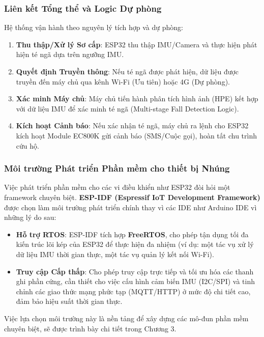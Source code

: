 \subsubsection{Liên kết Tổng thể và Logic Dự phòng}
Hệ thống vận hành theo nguyên lý tích hợp và dự phòng:
\begin{enumerate}
    \item \textbf{Thu thập/Xử lý Sơ cấp}: ESP32 thu thập IMU/Camera và thực hiện phát hiện té ngã dựa trên ngưỡng IMU.
    \item \textbf{Quyết định Truyền thông}: Nếu té ngã được phát hiện, dữ liệu được truyền đến máy chủ qua kênh Wi-Fi (Ưu tiên) hoặc 4G (Dự phòng).
    \item \textbf{Xác minh Máy chủ}: Máy chủ tiến hành phân tích hình ảnh (HPE) kết hợp với dữ liệu IMU để xác minh té ngã (Multi-stage Fall Detection Logic).
    \item \textbf{Kích hoạt Cảnh báo}: Nếu xác nhận té ngã, máy chủ ra lệnh cho ESP32 kích hoạt Module EC800K gửi cảnh báo (SMS/Cuộc gọi), hoàn tất chu trình cứu hộ.
\end{enumerate}

\subsubsection{Môi trường Phát triển Phần mềm cho thiết bị Nhúng}
Việc phát triển phần mềm cho các vi điều khiển như ESP32 đòi hỏi một framework chuyên biệt. \textbf{ESP-IDF (Espressif IoT Development Framework)} được chọn làm môi trường phát triển chính thay vì các IDE như Arduino IDE vì những lý do sau:
\begin{itemize}
    \item \textbf{Hỗ trợ RTOS}: ESP-IDF tích hợp \textbf{FreeRTOS}, cho phép tận dụng tối đa kiến trúc lõi kép của ESP32 để thực hiện đa nhiệm (ví dụ: một tác vụ xử lý dữ liệu IMU thời gian thực, một tác vụ quản lý kết nối Wi-Fi).
    \item \textbf{Truy cập Cấp thấp}: Cho phép truy cập trực tiếp và tối ưu hóa các thanh ghi phần cứng, cần thiết cho việc cấu hình cảm biến IMU (I2C/SPI) và tinh chỉnh các giao thức mạng phức tạp (MQTT/HTTP) ở mức độ chi tiết cao, đảm bảo hiệu suất thời gian thực.
\end{itemize}
Việc lựa chọn môi trường này là nền tảng để xây dựng các mô-đun phần mềm chuyên biệt, sẽ được trình bày chi tiết trong Chương 3.
